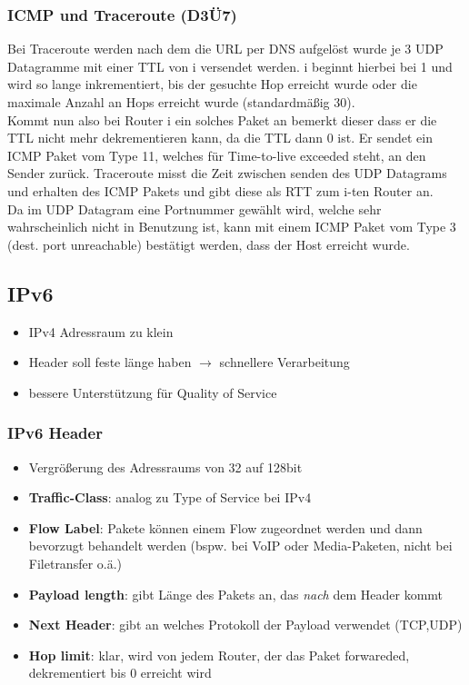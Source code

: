 \subsubsection{ICMP und Traceroute (D3Ü7)}
Bei Traceroute werden nach dem die URL per DNS aufgelöst wurde je 3 UDP Datagramme mit einer TTL von i versendet werden. i beginnt hierbei bei 1 und wird so lange inkrementiert, bis der gesuchte Hop erreicht wurde oder die maximale Anzahl an Hops erreicht wurde (standardmäßig 30).\\
\hfill \break
Kommt nun also bei Router i ein solches Paket an bemerkt dieser dass er die TTL nicht mehr dekrementieren kann, da die TTL dann 0 ist. Er sendet ein ICMP Paket vom Type 11, welches für Time-to-live exceeded steht, an den Sender zurück. Traceroute misst die Zeit zwischen senden des UDP Datagrams und erhalten des ICMP Pakets und gibt diese als RTT zum i-ten Router an.\\
\hfill \break
Da im UDP Datagram eine Portnummer gewählt wird, welche sehr wahrscheinlich nicht in Benutzung ist, kann mit einem ICMP Paket vom Type 3 (dest. port unreachable) bestätigt werden, dass der Host erreicht wurde.

\subsection{IPv6}
\begin{itemize}
    \item IPv4 Adressraum zu klein
    \item Header soll feste länge haben $\rightarrow$ schnellere Verarbeitung
    \item bessere Unterstützung für Quality of Service
\end{itemize}

\subsubsection{IPv6 Header}
\begin{itemize}
    \item Vergrößerung des Adressraums von 32 auf 128bit
    \item \textbf{Traffic-Class}: analog zu Type of Service bei IPv4
    \item \textbf{Flow Label}: Pakete können einem Flow zugeordnet werden und dann bevorzugt behandelt
    werden (bspw. bei VoIP oder Media-Paketen, nicht bei Filetransfer o.ä.)
    \item \textbf{Payload length}: gibt Länge des Pakets an, das \textit{nach} dem Header kommt
    \item \textbf{Next Header}: gibt an welches Protokoll der Payload verwendet (TCP,UDP)
    \item \textbf{Hop limit}: klar, wird von jedem Router, der das Paket forwareded, dekrementiert bis 0 erreicht wird
\end{itemize}

